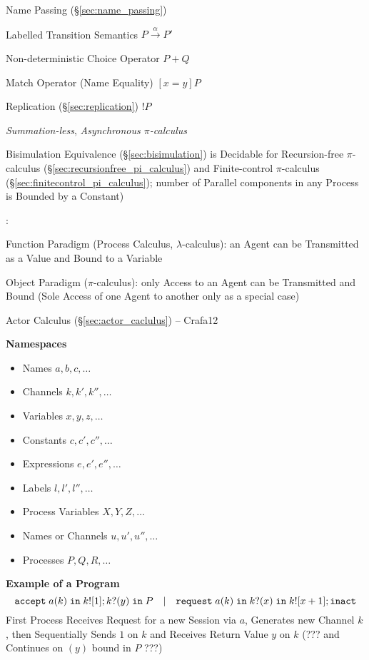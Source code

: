 Name Passing (\S\ref{sec:name_passing})

Labelled Transition Semantics $P \xrightarrow{\alpha} P'$

Non-deterministic Choice Operator $P + Q$

Match Operator (Name Equality) $[x=y]P$

Replication (\S\ref{sec:replication}) $!P$

\emph{Summation-less}, \emph{Asynchronous
  $\pi$-calculus} %
\cite{honda-vasconcelos-kubo98}

Bisimulation Equivalence (\S\ref{sec:bisimulation}) is Decidable for
Recursion-free $\pi$-calculus (\S\ref{sec:recursionfree_pi_calculus})
and Finite-control $\pi$-calculus
(\S\ref{sec:finitecontrol_pi_calculus}); number of Parallel components
in any Process is Bounded by a Constant)

\cite{milner92}:

Function Paradigm (Process Calculus, $\lambda$-calculus): an Agent can
be Transmitted as a Value and Bound to a Variable

Object Paradigm ($\pi$-calculus): only Access to an Agent can be
Transmitted and Bound (Sole Access of one Agent to another only as a
special case)

\fist Actor Calculus (\S\ref{sec:actor_caclulus}) -- Crafa12


\asterism


\textbf{Namespaces} \cite{honda-vasconcelos-kubo98}

\begin{itemize}
\item Names $a,b,c,\ldots$
\item Channels $k,k',k'',\ldots$
\item Variables $x,y,z,\ldots$
\item Constants $c,c',c'',\ldots$
\item Expressions $e,e',e'',\ldots$
\item Labels $l,l',l'',\ldots$
\item Process Variables $X,Y,Z,\ldots$
\item Names or Channels $u, u', u'', \ldots$
\item Processes $P,Q,R, \ldots$
\end{itemize}


\textbf{Example of a Program} \cite{honda-vasconcelos-kubo98}
\[
  \mathtt{accept} \; a(k) \; \mathtt{in} \; k![1];
  k?(y) \; \mathtt{in} \; P
  \quad | \quad
  \mathtt{request} \; a(k) \; \mathtt{in} \; k?(x)
  \; \mathtt{in} \; k![x+1]; \mathtt{inact}
\]
First Process Receives Request for a new Session via $a$, Generates
new Channel $k$, then Sequentially Sends $1$ on $k$ and Receives
Return Value $y$ on $k$ (??? and Continues on $(y)$ bound in $P$ ???)

